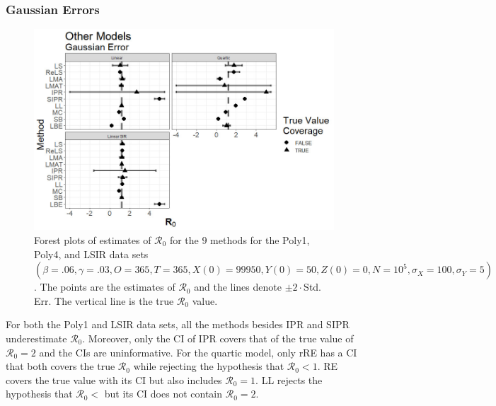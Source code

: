 \documentclass[12pt]{article}
\newcommand{\xxsir}{\ensuremath{9} } %
\newcommand{\rr}{\ensuremath{\mathcal{R}_0}}
\begin{document}
\subsubsection{Gaussian Errors}

\begin{figure}[H]
  \begin{center}
    \includegraphics[scale=0.5]{images/other_n.jpg}
  \caption{Forest plots of estimates of $\rr$ for the \xxsir methods for the Poly1, Poly4, and LSIR data sets $(\beta=.06, \gamma=.03, O=365, T=365, X(0)=99950, Y(0)=50, Z(0)=0, N=10^5, \sigma_X=100, \sigma_Y=5)$.  The points are the estimates of $\rr$ and the lines denote $\pm 2\cdot $Std. Err.  The vertical line is the true $\rr$ value.}
  \label{fig:other-res}	
  \end{center}
\end{figure}

For both the Poly1 and LSIR data sets, all the methods besides IPR and SIPR underestimate $\rr$.  Moreover, only the CI of IPR covers that of the true value of $\rr=2$ and the CIs are uninformative.  For the quartic model, only rRE has a CI that both covers the true $\rr$ while rejecting the hypothesis that $\rr < 1$.  RE covers the true value with its CI but also includes $\rr=1$.  LL rejects the hypothesis that $\rr <$ but its CI does not contain $\rr=2$.
\end{document}
